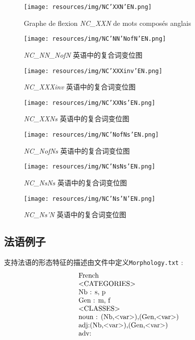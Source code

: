 \begin{figure}[!htb]
  \centering
  \texttt{[image: resources/img/NC'XXN'EN.png]}
  \caption{Graphe de flexion \emph{NC\_XXN} de mots composés anglais}
  \label{fig:NC'XXN}
\end{figure}

\begin{figure}[!htb]
  \centering
  \texttt{[image: resources/img/NC'NN'NofN'EN.png]}
  \caption{\emph{NC\_NN\_NofN} 英语中的复合词变位图}
  \label{fig:NC'NN'NofN'EN}
\end{figure}

\begin{figure}[!htb]
  \centering
  \texttt{[image: resources/img/NC'XXXinv'EN.png]}
  \caption{\emph{NC\_XXXinv} 英语中的复合词变位图}
  \label{fig:NC'XXXinv'EN}
\end{figure}

\begin{figure}[!htb]
  \centering
  \texttt{[image: resources/img/NC'XXNs'EN.png]}
  \caption{\emph{NC\_XXNs} 英语中的复合词变位图}
  \label{fig:NC'XXNs'EN}
\end{figure}

\begin{figure}[!htb]
  \centering
  \texttt{[image: resources/img/NC'NofNs'EN.png]}
  \caption{ \emph{NC\_NofNs} 英语中的复合词变位图}
  \label{fig:NC'NofNs'EN}
\end{figure}

\begin{figure}[!htb]
  \centering
  \texttt{[image: resources/img/NC'NsNs'EN.png]}
  \caption{\emph{NC\_NsNs} 英语中的复合词变位图}
  \label{fig:NC'NsNs'EN}
\end{figure}

\begin{figure}[!htb]
  \centering
  \texttt{[image: resources/img/NC'Ns'N'EN.png]}
  \caption{ \emph{NC\_Ns'N} 英语中的复合词变位图}
  \label{fig:NC'Ns'N'EN}
\end{figure}

\subsection{法语例子}
支持法语的形态特征的描述由文件中定义\verb+Morphology.txt+ :
\[
\begin{array}[l]{l}
$French$ \\
$<CATEGORIES>$ \\
$Nb : s, p$ \\
$Gen : m, f$ \\
$<CLASSES>$ \\
$noun : (Nb,<var>),(Gen,<var>)$ \\
$adj:(Nb,<var>),(Gen,<var>)$ \\
$adv:$
\end{array}
\]

